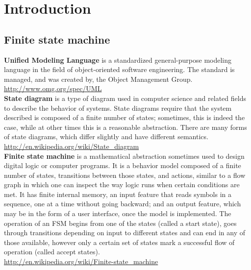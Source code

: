 \chapter{Introduction}

\section{Finite state machine}
\textbf{Unified Modeling Language} is a standardized general-purpose modeling language in the field of object-oriented software engineering. The standard is managed, and was created by, the Object Management Group.\\
\url{http://www.omg.org/spec/UML}\\

\textbf{State diagram} is a type of diagram used in computer science and related fields to describe the behavior of systems. State diagrams require that the system described is composed of a finite number of states; sometimes, this is indeed the case, while at other times this is a reasonable abstraction. There are many forms of state diagrams, which differ slightly and have different semantics.\\
\url{http://en.wikipedia.org/wiki/State\_diagram}\\

\textbf{Finite state machine} is a mathematical abstraction sometimes used to design digital logic or computer programs. It is a behavior model composed of a finite number of states, transitions between those states, and actions, similar to a flow graph in which one can inspect the way logic runs when certain conditions are met. It has finite internal memory, an input feature that reads symbols in a sequence, one at a time without going backward; and an output feature, which may be in the form of a user interface, once the model is implemented. The operation of an FSM begins from one of the states (called a start state), goes through transitions depending on input to different states and can end in any of those available, however only a certain set of states mark a successful flow of operation (called accept states).\\
\url{http://en.wikipedia.org/wiki/Finite-state\_machine}\\

